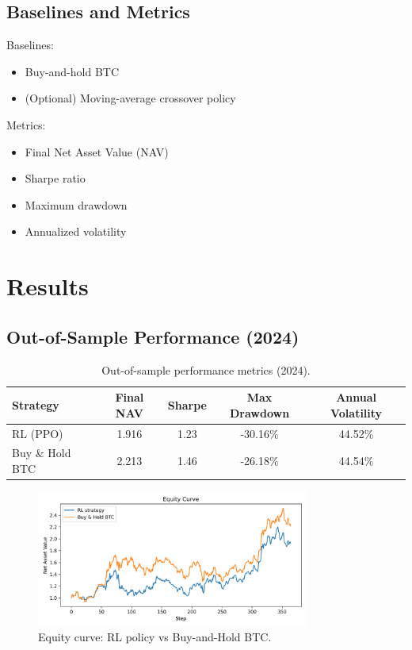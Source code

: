 \documentclass[12pt]{article}
\begin{document}
\subsection{Baselines and Metrics}
Baselines:
\begin{itemize}
    \item Buy-and-hold BTC
    \item (Optional) Moving-average crossover policy
\end{itemize}
Metrics:
\begin{itemize}
    \item Final Net Asset Value (NAV)
    \item Sharpe ratio
    \item Maximum drawdown
    \item Annualized volatility
\end{itemize}

\section{Results}
\subsection{Out-of-Sample Performance (2024)}
\begin{table}[H]
\centering
\begin{tabular}{lcccc}
\toprule
Strategy & Final NAV & Sharpe & Max Drawdown & Annual Volatility \\
\midrule
RL (PPO) & 1.916 & 1.23 & -30.16\% & 44.52\% \\
Buy \& Hold BTC & 2.213 & 1.46 & -26.18\% & 44.54\% \\
\bottomrule
\end{tabular}
\caption{Out-of-sample performance metrics (2024).}
\end{table}

\begin{figure}[H]
\centering
\includegraphics[width=0.8\textwidth]{experiments/plots/equity_curve_rl.png}
\caption{Equity curve: RL policy vs Buy-and-Hold BTC.}
\end{figure}
\end{document}
